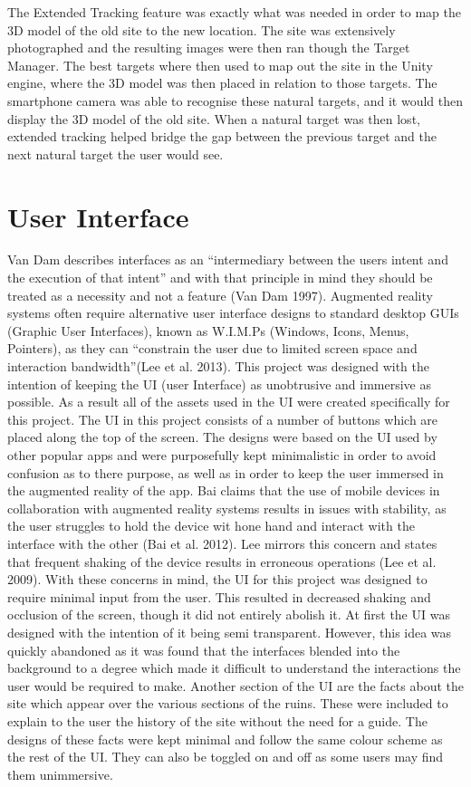 The Extended Tracking feature was exactly what was needed in order to map the 3D model of the old site to the new location. The site was extensively photographed and the resulting images were then ran though the Target Manager. The best targets where then used to map out the site in the Unity engine, where the 3D model was then placed in relation to those targets. The smartphone camera was able to recognise these natural targets, and it would then display the 3D model of the old site. When a natural target was then lost, extended tracking helped bridge the gap between the previous target and the next natural target the user would see.


\section{User Interface}
Van Dam describes interfaces as an “intermediary between the users intent and the execution of that intent”  and with that principle in mind they should be treated as a necessity and not a feature (Van Dam 1997). Augmented reality systems often require alternative user interface designs to standard desktop GUIs (Graphic User Interfaces), known as W.I.M.Ps (Windows, Icons, Menus, Pointers), as they can “constrain the user due to limited screen space and interaction bandwidth”(Lee et al. 2013). This project was designed with the intention of keeping the UI (user Interface) as unobtrusive and immersive as possible. As a result all of the assets used in the UI were created specifically for this project. The UI in this project consists of a number of buttons which are placed along the top of the screen. The designs were based on the UI used by other popular apps and were purposefully kept minimalistic in order to avoid confusion as to there purpose, as well as in order to keep the user immersed in the augmented reality of the app.
Bai claims that the use of mobile devices in collaboration with augmented reality systems results in issues with stability, as the user struggles to hold the device wit hone hand and interact with the interface with the other (Bai et al. 2012). Lee mirrors this concern and states that frequent shaking of the device results in erroneous operations (Lee et al. 2009).
With these concerns in mind, the UI for this project was designed to require minimal input from the user. This resulted in decreased shaking and occlusion of the screen, though it did not entirely abolish it.
At first the UI was designed with the intention of it being semi transparent. However, this idea was quickly abandoned as it was found that the interfaces blended into the background to a degree which made it difficult to understand the interactions the user would be required to make.
Another section of the UI are the facts about the site which appear over the various sections of the ruins. These were included to explain to the user the history of the site without the need for a guide. The designs of these facts were kept minimal and follow the same colour scheme as the rest of the UI. They can also be toggled on and off as some users may find them unimmersive.

